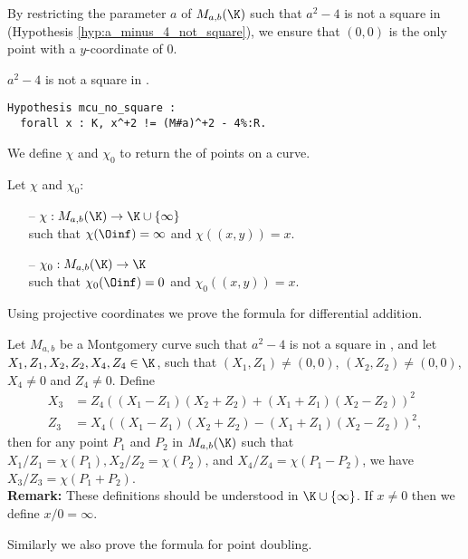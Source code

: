 By restricting the parameter $a$ of $M_{a,b}(\K)$ such that $a^2-4$ is not a
square in \K (Hypothesis \ref{hyp:a_minus_4_not_square}),
we ensure that $(0,0)$ is the only point with a $y$-coordinate of $0$.
\begin{hypothesis}
  \label{hyp:a_minus_4_not_square}
  $a^2-4$ is not a square in \K.
\end{hypothesis}
\begin{lstlisting}[language=Coq]
Hypothesis mcu_no_square :
  forall x : K, x^+2 != (M#a)^+2 - 4%:R.
\end{lstlisting}

We define $\chi$ and $\chi_0$ to return the \xcoord of points on a curve.
\begin{dfn}Let $\chi$ and $\chi_0$:\\
  \vspace{-1em}
  \begin{itemize}
    \item[--] $\chi : M_{a,b}(\K) \to \K \cup \{\infty\}$\\
          such that $\chi(\Oinf) = \infty$ and $\chi((x,y)) = x$.
    \item[--] $\chi_0 : M_{a,b}(\K) \to \K$\\
          such that $\chi_0(\Oinf) = 0$ and $\chi_0((x,y)) = x$.
  \end{itemize}
\end{dfn}
Using projective coordinates we prove the formula for differential addition.%
\begin{lemma}
  \label{lemma:xADD}
  Let $M_{a,b}$ be a Montgomery curve such that $a^2-4$ is not a square in \K, and
  let $X_1, Z_1, X_2, Z_2, X_4, Z_4 \in \K$, such that $(X_1,Z_1) \neq (0,0)$,
  $(X_2,Z_2) \neq (0,0)$, $X_4 \neq 0$ and $Z_4 \neq 0$.
  Define
  \begin{align*}
    X_3 & = Z_4((X_1 - Z_1)(X_2+Z_2) + (X_1+Z_1)(X_2-Z_2))^2  \\
    Z_3 & = X_4((X_1 - Z_1)(X_2+Z_2) - (X_1+Z_1)(X_2-Z_2))^2,
  \end{align*}
  then for any point $P_1$ and $P_2$ in $M_{a,b}(\K)$ such that
  $X_1/Z_1 = \chi(P_1), X_2/Z_2 = \chi(P_2)$, and $X_4/Z_4 = \chi(P_1 - P_2)$,
  we have $X_3/Z_3 = \chi(P_1+P_2)$.\\
  \textbf{Remark:}
  These definitions should be understood in $\K \cup \{\infty\}$.
  If $x\ne 0$ then we define $x/0 = \infty$.
\end{lemma}
Similarly we also prove the formula for point doubling.%
